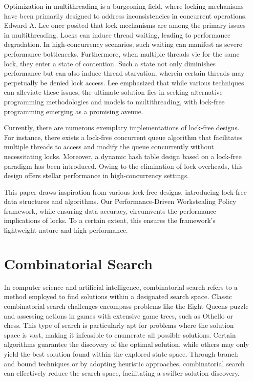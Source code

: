 \documentclass{mproj}
\begin{document}
Optimization in multithreading is a burgeoning field,
where locking mechanisms have been primarily designed to address inconsistencies in concurrent operations.
Edward A. Lee once posited that lock mechanisms are among the primary issues in multithreading\cite{1631937}.
Locks can induce thread waiting, leading to performance degradation.
In high-concurrency scenarios, such waiting can manifest as severe performance bottlenecks.
Furthermore, when multiple threads vie for the same lock, they enter a state of contention.
Such a state not only diminishes performance but can also induce thread starvation,
wherein certain threads may perpetually be denied lock access.
Lee emphasized that while various techniques can alleviate these issues,
the ultimate solution lies in seeking alternative programming methodologies and models to multithreading,
with lock-free programming emerging as a promising avenue.

Currently, there are numerous exemplary implementations of lock-free designs.
For instance, there exists a lock-free concurrent queue algorithm that facilitates multiple threads to access
and modify the queue concurrently without necessitating locks\cite{10.1145/248052.248106}.
Moreover, a dynamic hash table design based on a lock-free paradigm has been introduced.
Owing to the elimination of lock overheads, this design offers stellar performance in high-concurrency settings\cite{10.1145/564870.564881}.

This paper draws inspiration from various lock-free designs,
introducing lock-free data structures and algorithms.
Our Performance-Driven Workstealing Policy framework, while ensuring data accuracy,
circumvents the performance implications of locks.
To a certain extent, this ensures the framework's lightweight nature and high performance.

\section{Combinatorial Search}
In computer science and artificial intelligence, combinatorial search refers to a method employed
to find solutions within a designated search space.
Classic combinatorial search challenges encompass problems like the Eight Queens puzzle and
assessing actions in games with extensive game trees, such as Othello or chess.
This type of search is particularly apt for problems where the solution space is vast,
making it infeasible to enumerate all possible solutions.
Certain algorithms guarantee the discovery of the optimal solution,
while others may only yield the best solution found within the explored state space.
Through branch and bound techniques or by adopting heuristic approaches,
combinatorial search can effectively reduce the search space, facilitating a swifter solution discovery.
\end{document}
